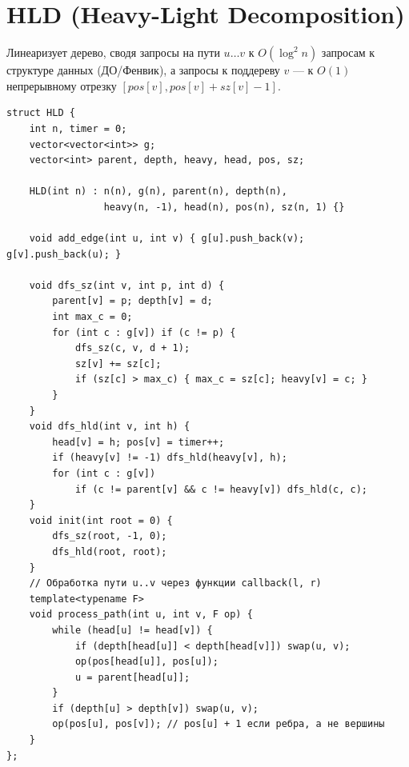 \section{HLD (Heavy-Light Decomposition)}
Линеаризует дерево, сводя запросы на пути $u \ldots v$ к $O(\log^2 n)$ запросам к структуре данных (ДО/Фенвик), а запросы к поддереву $v$ --- к $O(1)$ непрерывному отрезку $[pos[v], pos[v] + sz[v] - 1]$.
\begin{lstlisting}[name=hld]
struct HLD {
    int n, timer = 0;
    vector<vector<int>> g;
    vector<int> parent, depth, heavy, head, pos, sz;

    HLD(int n) : n(n), g(n), parent(n), depth(n),
                 heavy(n, -1), head(n), pos(n), sz(n, 1) {}

    void add_edge(int u, int v) { g[u].push_back(v); g[v].push_back(u); }

    void dfs_sz(int v, int p, int d) {
        parent[v] = p; depth[v] = d;
        int max_c = 0;
        for (int c : g[v]) if (c != p) {
            dfs_sz(c, v, d + 1);
            sz[v] += sz[c];
            if (sz[c] > max_c) { max_c = sz[c]; heavy[v] = c; }
        }
    }
    void dfs_hld(int v, int h) {
        head[v] = h; pos[v] = timer++;
        if (heavy[v] != -1) dfs_hld(heavy[v], h);
        for (int c : g[v])
            if (c != parent[v] && c != heavy[v]) dfs_hld(c, c);
    }
    void init(int root = 0) {
        dfs_sz(root, -1, 0);
        dfs_hld(root, root);
    }
    // Обработка пути u..v через функции callback(l, r)
    template<typename F>
    void process_path(int u, int v, F op) {
        while (head[u] != head[v]) {
            if (depth[head[u]] < depth[head[v]]) swap(u, v);
            op(pos[head[u]], pos[u]);
            u = parent[head[u]];
        }
        if (depth[u] > depth[v]) swap(u, v);
        op(pos[u], pos[v]); // pos[u] + 1 если ребра, а не вершины
    }
};
\end{lstlisting}


